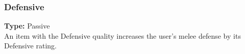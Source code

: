 \subsubsection{Defensive}
\label{iqty:defensive}
\textbf{Type:} Passive\\
An item with the Defensive quality increases the user’s
melee defense by its Defensive rating.
